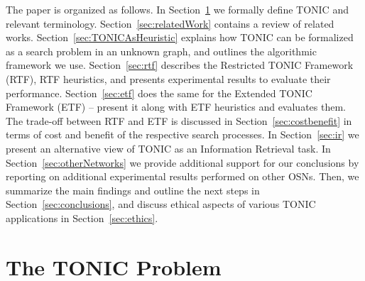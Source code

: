 \documentclass[journal]{IEEEtran}
\begin{document}
 


The paper is organized as follows. In Section~\ref{sec:problem} we formally define TONIC and relevant terminology. Section~\ref{sec:relatedWork} contains a review of related works. Section~\ref{sec:TONICAsHeuristic} explains how TONIC can be formalized as a search problem in an unknown graph, and outlines the algorithmic framework we use. Section~\ref{sec:rtf} describes the Restricted TONIC Framework (RTF), RTF heuristics, and presents experimental results to evaluate their performance. Section~\ref{sec:etf} does the same for the Extended TONIC Framework (ETF) -- present it along with ETF heuristics and evaluates them. The trade-off between RTF and ETF is discussed in Section~\ref{sec:costbenefit} in terms of cost and benefit of the respective search processes. In Section~\ref{sec:ir} we present an alternative view of TONIC as an Information Retrieval task. In Section~\ref{sec:otherNetworks} we provide additional support for our conclusions by reporting on additional experimental results performed on other OSNs. Then, we summarize the main findings and outline the next steps in Section~\ref{sec:conclusions}, and discuss ethical aspects of various TONIC applications in Section~\ref{sec:ethics}. 





\section{The TONIC Problem}
\label{sec:problem}
\end{document}
